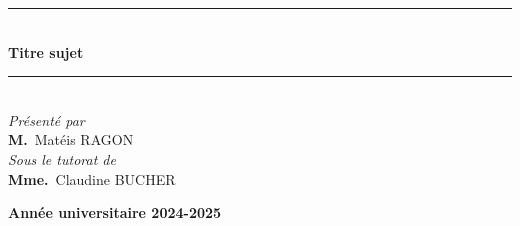 \documentclass[a4paper,12pt]{report}
\begin{document}
\begin{titlepage}
\begin{center}
			\rule{\linewidth}{0.3mm} \\[0.4cm]
			{ \huge \bfseries\color{blue} Titre sujet \\[0.4cm] }
			\rule{\linewidth}{0.3mm} \\[3cm]


			{\large \textit{Présenté par}}\\[0.5cm]

			\color{black}
			\centering
			\large \textbf{M.}~Matéis \textsc{RAGON} \\[1cm]

			{\large \textit{Sous le tutorat de}}\\[0.5cm]

			\color{black}
			\centering
			\large \textbf{Mme.}~Claudine \textsc{BUCHER} \\[0.1cm]

			\vfill

			{\textbf{\large {Année universitaire} 2024-2025}}

		\end{center}
	\end{titlepage}
\end{document}
